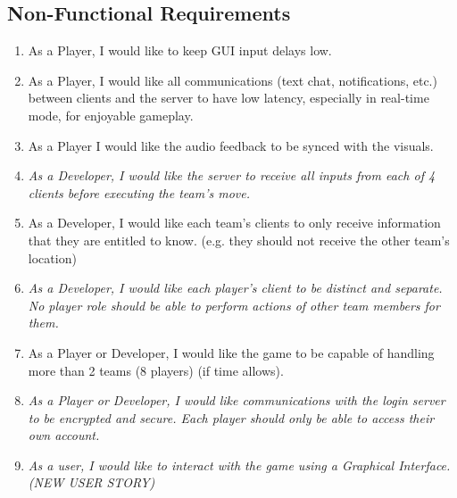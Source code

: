 \subsection*{Non-Functional Requirements}
\begin{enumerate}[resume, leftmargin=\listmargin]
\item As a Player, I would like to keep GUI input delays low.
\item As a Player, I would like all communications (text chat, notifications, etc.) between clients and the server to have low latency, especially in real-time mode, for enjoyable gameplay.
\item As a Player I would like the audio feedback to be synced with the visuals.
\item \textit{As a Developer, I would like the server to receive all inputs from each of 4 clients before executing the team's move.}
\item As a Developer, I would like each team's clients to only receive information that they are entitled to know. (e.g. they should not receive the other team's location)
\item \textit{As a Developer, I would like each player's client to be distinct and separate. No player role should be able to perform actions of other team members for them.}
\item As a Player or Developer, I would like the game to be capable of handling more than 2 teams (8 players) (if time allows).
\item \textit{As a Player or Developer, I would like communications with the login server to be encrypted and secure. Each player should only be able to access their own account.}
\item \textit{As a user, I would like to interact with the game using a Graphical Interface. (NEW USER STORY)}
\end{enumerate}
